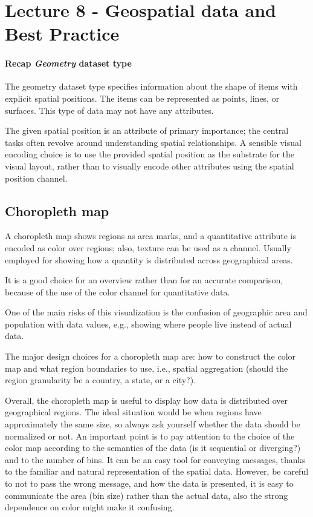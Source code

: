 \chapter{Lecture 8 - Geospatial data and Best Practice}
\subsubsection{Recap \emph{Geometry} dataset type}
The geometry dataset type specifies information about the shape of items with explicit spatial positions. The items can be represented as points, lines, or surfaces. This type of data may not have any attributes. \par
The given spatial position is an attribute of primary importance; the central tasks often revolve around understanding spatial relationships. A sensible visual encoding choice is to use the provided spatial position as the substrate for the visual layout, rather than to visually encode other attributes using the spatial position channel.

\section{Choropleth map}
A choropleth map shows regions as area marks, and a quantitative attribute is encoded as color over regions; also, texture can be used as a channel. Usually employed for showing how a quantity is distributed across geographical areas. \par
It is a good choice for an overview rather than for an accurate comparison, because of the use of the color channel for quantitative data. \par
One of the main risks of this visualization is the confusion of geographic area and population with data values, e.g., showing where people live instead of actual data. \par
The major design choices for a choropleth map are: how to construct the color map and what region boundaries to use, i.e., spatial aggregation (should the region granularity be a country, a state, or a city?). \par
Overall, the choropleth map is useful to display how data is distributed over geographical regions. The ideal situation would be when regions have approximately the same size, so always ask yourself whether the data should be normalized or not. An important point is to pay attention to the choice of the color map according to the semantics of the data (is it sequential or diverging?) and to the number of bins. It can be an easy tool for conveying messages, thanks to the familiar and natural representation of the spatial data. However, be careful to not to pass the wrong message, and how the data is presented, it is easy to communicate the area (bin size) rather than the actual data, also the strong dependence on color might make it confusing. 

